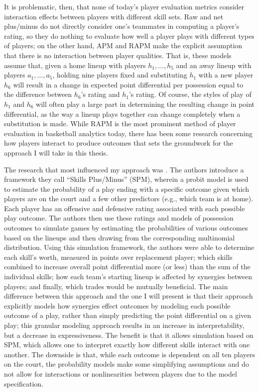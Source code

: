 It is problematic, then, that none of today's player evaluation metrics consider
interaction effects between players with different skill sets. Raw and net
plus/minus do not directly consider one's teammates in computing a player's rating,
so they do nothing to evaluate how well a player plays with different types of
players; on the other hand, APM and RAPM make the explicit assumption that there is
no interaction between player qualities. That is, these models assume that, given a
home lineup with players $h_1, \dots, h_5$ and an away lineup with players $a_1,
\dots, a_5$, holding nine players fixed and substituting $h_1$ with a new player
$h_6$ will result in a change in expected point differential per possession equal to
the difference between $h_6$'s rating and $h_1$'s rating. Of course, the styles of
play of $h_1$ and $h_6$ will often play a large part in determining the resulting
change in point differential, as the way a lineup plays together can change
completely when a substitution is made. While RAPM is the most prominent method of
player evaluation in basketball analytics today, there has been some research
concerning how players interact to produce outcomes that sets the groundwork for the
approach I will take in this thesis.

The research that most influenced my approach was \citet{Maymin}. The authors
introduce a framework they call ``Skills Plus/Minus'' (SPM), wherein a probit model
is used to estimate the probability of a play ending with a specific outcome given
which players are on the court and a few other predictors (e.g., which team is at
home). Each player has an offensive and defensive rating associated with each
possible play outcome. The authors then use these ratings and models of possession
outcomes to simulate games by estimating the probabilities of various outcomes based
on the lineups and then drawing from the corresponding multinomial distribution.
Using this simulation framework, the authors were able to determine each skill's
worth, measured in points over replacement player; which skills combined to increase
overall point differential more (or less) than the sum of the individual skills; how
each team’s starting lineup is affected by synergies between players; and finally,
which trades would be mutually beneficial. The main difference between this approach
and the one I will present is that their approach explicitly models how synergies
effect outcomes by modeling each possible outcome of a play, rather than simply
predicting the point differential on a given play; this granular modeling approach
results in an increase in interpretability, but a decrease in expressiveness. The
benefit is that it allows simulation based on SPM, which allows one to interpret
exactly how different skills interact with one another. The downside is that, while
each outcome is dependent on all ten players on the court, the probability models
make some simplifying assumptions and do not allow for interactions or
nonlinearities between players due to the model specification.

